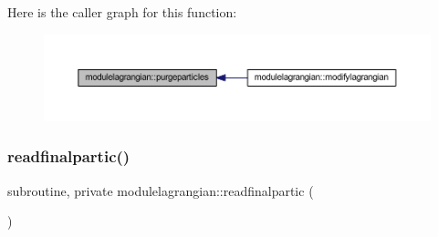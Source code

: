 Here is the caller graph for this function\+:\nopagebreak
\begin{figure}[H]
\begin{center}
\leavevmode
\includegraphics[width=350pt]{namespacemodulelagrangian_a4ad3bdd3ff9c81a87e1b11eeea429acd_icgraph}
\end{center}
\end{figure}
\mbox{\label{namespacemodulelagrangian_aa8ba43a560dd11df5632a522066b74a6}} 
\subsubsection{\texorpdfstring{readfinalpartic()}{readfinalpartic()}}
{\footnotesize\ttfamily subroutine, private modulelagrangian\+::readfinalpartic (\begin{DoxyParamCaption}{ }\end{DoxyParamCaption})\hspace{0.3cm}{\ttfamily [private]}}

